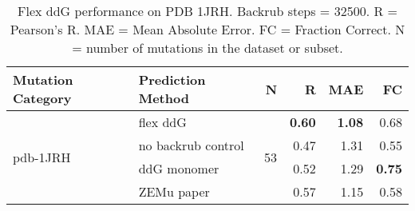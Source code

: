 \begin{table}
  \begin{tabular}{llrrrr}
\toprule
Mutation Category &   Prediction Method &   N &    R &  MAE &   FC \\
\midrule
 \multirow{ 4}{*}{pdb-1JRH} & flex ddG & \multirow{ 4}{*}{53} & \textbf{0.60} & \textbf{1.08} & 0.68  \\
 & no backrub control & & 0.47 & 1.31 & 0.55  \\
 & ddG monomer & & 0.52 & 1.29 & \textbf{0.75}  \\
 & ZEMu paper & & 0.57 & 1.15 & 0.58  \\
\bottomrule
\end{tabular}
  \caption[Flex ddG performance on PDB 1JRH]{
    Flex ddG performance on PDB 1JRH. Backrub steps = 32500. R = Pearson's R. MAE = Mean Absolute Error. FC = Fraction Correct. N = number of mutations in the dataset or subset.
  } \label{tab:table-pdb-1JRH}
\end{table}
